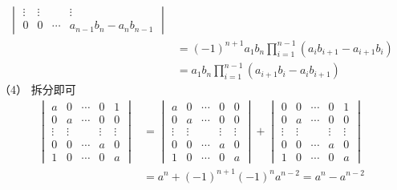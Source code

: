 \begin{solution}
\begin{align*}
\begin{vmatrix}
	 \vdots & \vdots &		  & \vdots\\
	0&0&\cdots&a_{n-1}b_n-a_nb_{n-1}
\end{vmatrix}\\
&=\left(-1\right)^{n+1}a_1b_n
\prod _{i = 1}^{n-1}\left(
	a_ib_{i+1}-a_{i+1}b_i
\right)\\
&=a_1b_n
\prod _{i = 1}^{n-1}\left(
	a_{i+1}b_{i}-a_{i}b_{i+1}
\right)
\end{align*}
\textup{（4）}
拆分即可
\begin{align*}
	\begin{vmatrix}
	a & 0 & \cdots & 0 & 1\\
	0 & a & \cdots & 0 & 0\\
	\vdots & \vdots & & \vdots & \vdots\\
	0 & 0 &\cdots &a & 0\\
	1 & 0&\cdots &0&a
\end{vmatrix}
&=\begin{vmatrix}
	a & 0 & \cdots & 0 & 0\\
	0 & a & \cdots & 0 & 0\\
	\vdots & \vdots & & \vdots & \vdots\\
	0 & 0 &\cdots &a & 0\\
	1 & 0&\cdots &0&a
\end{vmatrix}
+
\begin{vmatrix}
	0 & 0 & \cdots & 0 & 1\\
	0 & a & \cdots & 0 & 0\\
	\vdots & \vdots & & \vdots & \vdots\\
	0 & 0 &\cdots &a & 0\\
	1 & 0&\cdots &0&a
\end{vmatrix}\\
&=a^n+\left(-1\right)^{n+1}
\left(-1\right)^na^{n-2}
=a^n-a^{n-2}
\end{align*}
\end{solution}

